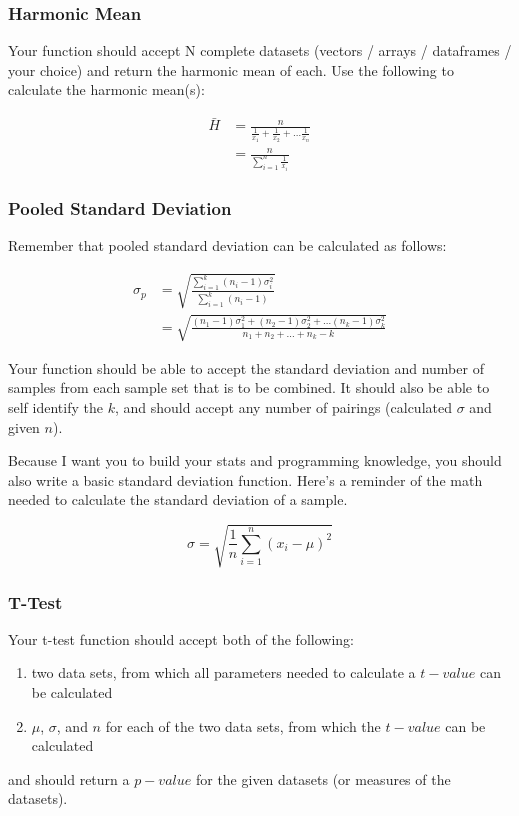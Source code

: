 \documentclass[11pt]{article}
\begin{document}
\subsubsection*{Harmonic Mean}
Your function should accept N complete datasets (vectors / arrays / dataframes / your choice) and return the harmonic mean of each.  Use the following to calculate the harmonic mean(s):

\begin{align*}
\bar{H} &= \frac{n}{\frac{1}{x_1} + \frac{1}{x_2} + \ldots \frac{1}{x_n}} \\
&= \frac{n}{\sum_{i=1}^n \frac{1}{x_i}}
\end{align*}

\subsubsection*{Pooled Standard Deviation}

Remember that pooled standard deviation can be calculated as follows:

\begin{align*}
\sigma_p &= \sqrt{ \frac{\sum_{i=1}^k (n_i - 1)\sigma_i^2}{\sum_{i=1}^k (n_i - 1)} } \\
&= \sqrt{ \frac{(n_1-1)\sigma_1^2 + (n_2-1)\sigma_2^2 + \ldots (n_k-1)\sigma_k^2}{n_1 + n_2 + \ldots + n_k - k} }
\end{align*}

Your function should be able to accept the standard deviation and number of samples from each sample set that is to be combined.  It should also be able to self identify the $k$, and should accept any number of pairings (calculated $\sigma$ and given $n$).

Because I want you to build your stats and programming knowledge, you should also write a basic standard deviation function.  Here's a reminder of the math needed to calculate the standard deviation of a sample.

\begin{equation*}
\sigma = \sqrt{ \frac{1}{n} \sum_{i=1}^{n} (x_i - \mu)^2 }
\end{equation*}

\subsubsection*{T-Test}
Your t-test function should accept both of the following:
\begin{enumerate}
    \item two data sets, from which all parameters needed to calculate a $t-value$ can be calculated
    \item $\mu$, $\sigma$, and $n$ for each of the two data sets, from which the $t-value$ can be calculated
\end{enumerate}
and should return a $p-value$ for the given datasets (or measures of the datasets).
\end{document}
